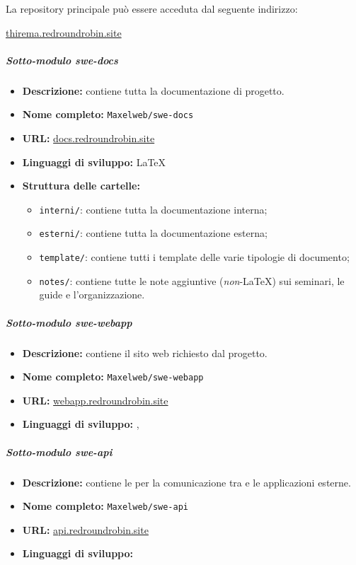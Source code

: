 		La repository principale può essere acceduta dal seguente indirizzo:

		\href{https://github.com/Maxelweb/swe-thirema}{thirema.redroundrobin.site}

		\subparagraph{Sotto-modulo swe-docs}

		\begin{itemize}
		 	\item \textbf{Descrizione:} contiene tutta la documentazione di progetto.
		 	\item \textbf{Nome completo:} \verb!Maxelweb/swe-docs!
		 	\item \textbf{URL:} \href{https://github.com/Maxelweb/swe-docs}{docs.redroundrobin.site}
		 	\item \textbf{Linguaggi di sviluppo:} \LaTeX{}
		 	\item \textbf{Struttura delle cartelle:}
			\begin{itemize}
				\item \verb!interni/!: contiene tutta la documentazione interna;
				\item \verb!esterni/!: contiene tutta la documentazione esterna;
				\item \verb!template/!: contiene tutti i template delle varie tipologie di documento;
				\item \verb!notes/!: contiene tutte le note aggiuntive (\textit{non}-\LaTeX{}) sui seminari, le guide e l'organizzazione.
			\end{itemize}
		 \end{itemize}

		\subparagraph{Sotto-modulo swe-webapp}

		\begin{itemize}
		 	\item \textbf{Descrizione:} contiene il sito web richiesto dal progetto.
		 	\item \textbf{Nome completo:} \verb!Maxelweb/swe-webapp!
		 	\item \textbf{URL:} \href{https://github.com/Maxelweb/swe-webapp}{webapp.redroundrobin.site}
		 	\item \textbf{Linguaggi di sviluppo:} , 
		 \end{itemize}

		\subparagraph{Sotto-modulo swe-api}

		\begin{itemize}
		 	\item \textbf{Descrizione:} contiene le  per la comunicazione tra  e le applicazioni esterne.
		 	\item \textbf{Nome completo:} \verb!Maxelweb/swe-api!
		 	\item \textbf{URL:} \href{https://github.com/Maxelweb/swe-api}{api.redroundrobin.site}
		 	\item \textbf{Linguaggi di sviluppo:} 
		 \end{itemize}

